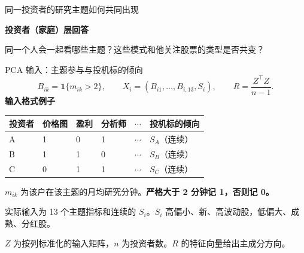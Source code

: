 \begin{frame}[label=pc-why]{同一投资者的研究主题如何共同出现}
  {\textbf{投资者（家庭）层回答}\par\small
    同一个人会一起看哪些主题？这些模式和他关注股票的类型是否共变？}
  \medskip
\end{frame}

\begin{frame}[t,label=pc-input]{PCA 输入：主题参与与投机标的倾向}
  \vspace{-.65em}
  \setlength{\abovedisplayskip}{3pt}
  \setlength{\belowdisplayskip}{4pt}
  \[
    B_{ik}=\mathbf{1}\{m_{ik}>2\},
    \qquad X_i=(B_{i1},\ldots,B_{i,13},S_i),
    \qquad R=\frac{Z^\top Z}{n-1}.
  \]
  \small
  \setlength{\parskip}{1pt}
  \renewcommand{\arraystretch}{1.06}
  \textbf{输入格式例子}\par\smallskip
  \begin{tabularx}{\linewidth}{@{}l*{4}{Y}L{.21\linewidth}@{}}
    \toprule 投资者 & 价格图 & 盈利 & 分析师 & \(\cdots\) & 投机标的倾向\\\midrule
    A & 1 & 0 & 1 & \(\cdots\) & \(S_A\)（连续）\\
    B & 1 & 1 & 0 & \(\cdots\) & \(S_B\)（连续）\\
    C & 0 & 1 & 1 & \(\cdots\) & \(S_C\)（连续）\\\bottomrule
  \end{tabularx}\par\smallskip
  \(m_{ik}\) 为该户在该主题的月均研究分钟。\textbf{严格大于 2 分钟记 1，否则记 0。}\par
  实际输入为 13 个主题指标和连续的 \(S_i\)。\(S_i\) 高偏小、新、高波动股，低偏大、成熟、分红股。\par
  \(Z\) 为按列标准化的输入矩阵，\(n\) 为投资者数。\(R\) 的特征向量给出主成分方向。
\end{frame}

